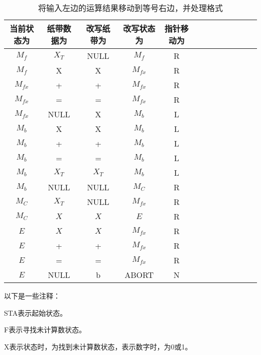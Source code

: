 \documentclass[UTF8]{ctexart}
\begin{document}
\begin{table}[h!]
    \begin{center}
        \caption{将输入左边的运算结果移动到等号右边，并处理格式}
        \begin{tabular}{|c|c|c|c|c|c|c|c|c|c|c|c|c|}
            \hline
            当前状态为 & 纸带数据为 & 改写纸带为 & 改写状态为 & 指针移动为 \\
            \hline
            $M_{f}$ & $X_{T}$ & NULL & $M_{f}$ & R \\
            \hline
            $M_{f}$ & X & X & $M_{fx}$ & R \\
            \hline
            $M_{fx}$ & + & + & $M_{fx}$ & R \\
            \hline
            $M_{fx}$ & = & = & $M_{fx}$ & R \\
            \hline
            $M_{fx}$ & NULL & X & $M_{b}$ & L \\
            \hline
            $M_{b}$ & X & X & $M_{b}$ & L \\
            \hline
            $M_{b}$ & + & + & $M_{b}$ & L \\
            \hline
            $M_{b}$ & = & = & $M_{b}$ & L \\
            \hline
            $M_{b}$ & $X_{T}$ & $X_{T}$ & $M_{b}$ & L \\
            \hline
            $M_{b}$ & NULL & NULL & $M_{C}$ & R \\
            \hline
            $M_{C}$ & $X_{T}$ & NULL & $M_{fx}$ & R \\
            \hline
            $M_{C}$ & $X$ & $X$ & $E$ & R \\
            \hline
            $E$ & $X$ & $X$ & $M_{fx}$ & R \\
            \hline
            $E$ & + & + & $M_{fx}$ & R \\
            \hline
            $E$ & = & = & $M_{fx}$ & R \\
            \hline
            $E$ & NULL & b & ABORT & N \\

            \hline
        \end{tabular}
    \end{center}
\end{table}

\newpage
以下是一些注释：

STA表示起始状态。

F表示寻找未计算数状态。

X表示状态时，为找到未计算数状态，表示数字时，为0或1。
\end{document}
